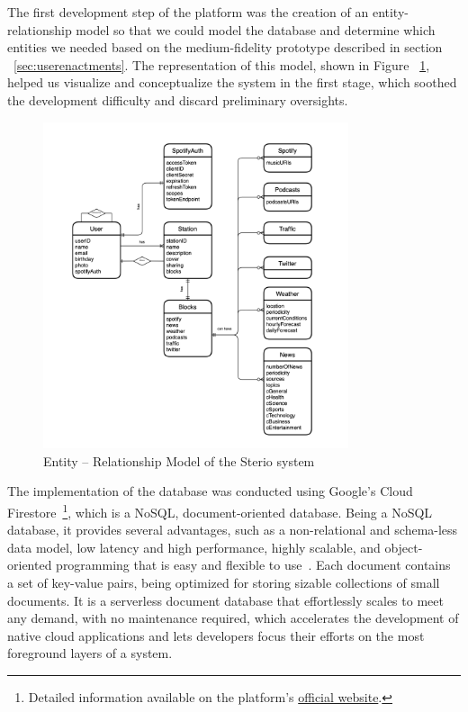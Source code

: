 The first development step of the platform was the creation of an entity-relationship model so that we could model the database and determine which entities we needed based on the medium-fidelity prototype described in section ~\ref{sec:userenactments}. The representation of this model, shown in Figure ~\ref{fig:eadiagram}, helped us visualize and conceptualize the system in the first stage, which soothed the development difficulty and discard preliminary oversights.

\begin{figure}[h]
\centering
\includegraphics[width=0.8\textwidth]{./Images/ea.png}
\caption{Entity – Relationship Model of the Sterio system}
\label{fig:eadiagram}
\end{figure}


The implementation of the database was conducted using Google's Cloud Firestore~\footnote{Detailed information available on the platform's \href{https://firebase.google.com/products/firestore}{official website}.}, which is a NoSQL, document-oriented database. Being a NoSQL database, it provides several advantages, such as a non-relational and schema-less data model, low latency and high performance, highly scalable, and object-oriented programming that is easy and flexible to use~\cite{Stonebraker2010}. Each document contains a set of key-value pairs, being optimized for storing sizable collections of small documents. It is a serverless document database that effortlessly scales to meet any demand, with no maintenance required, which accelerates the development of native cloud applications and lets developers focus their efforts on the most foreground layers of a system.

